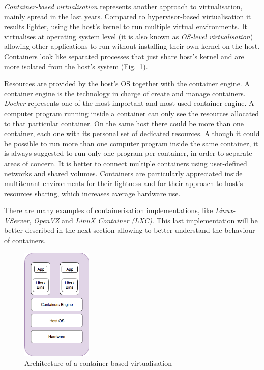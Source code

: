 \documentclass[a4paper,12pt]{article}
\def\myfig#1{Fig.~#1\xspace}
\begin{document}
\textit{Container-based virtualisation} represents another approach to
virtualisation, mainly spread in the last years. Compared to hypervisor-based
virtualisation it results lighter, using the host's kernel to run multiple
virtual environments. It virtualises at operating system level (it is also known
as \textit{OS-level virtualisation}) allowing other applications to run without
installing their own kernel on the host. Containers look like separated processes
that just share host's kernel and are more isolated from the host's
system (\myfig{\ref{fig:container_architecture}}). \par Resources are provided by
the host's OS together with the container engine. A container engine is the
technology in charge of create and manage containers. \textit{Docker} represents
one of the most important and most used container engine. A computer program
running inside a container can only see the resources allocated to that particular
container. On the same host there could be more than one container, each one
with its personal set of dedicated resources. Although it could be possible to
run more than one computer program inside the same container, it is always
suggested to run only one program per container, in order to separate areas of
concern. It is better to connect multiple containers using user-defined networks
and shared volumes. Containers are particularly appreciated inside multitenant
environments for their lightness and for their approach to host's resources
sharing, which increases average hardware use.\par There are many examples of
containerisation implementations, like \textit{Linux-VServer}, \textit{OpenVZ}
and \textit{LinuX Container (LXC)}. This last implementation will be better
described in the next section allowing to better understand the behaviour of
containers. 

\begin{figure}[ht!]
  \centerline{\includegraphics[width=0.3\textwidth]{container_architecture.png}}
  \caption{Architecture of a container-based virtualisation}
  \label{fig:container_architecture}
  \end{figure}
\end{document}
